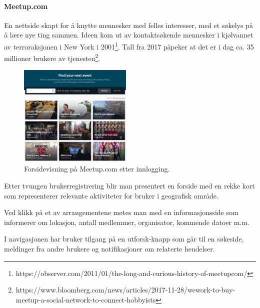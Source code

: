 \vspace{5mm} %

\paragraph{Meetup.com} En nettside skapt for å knytte mennesker med felles interesser, med et søkelys på å lære nye ting sammen. Ideen kom ut av kontaktsøkende mennesker i kjølvannet av terroraksjonen i New York i 2001\footnote{https://observer.com/2011/01/the-long-and-curious-history-of-meetupcom/}. Tall fra 2017 påpeker at det er i dag ca. 35 millioner brukere av tjenesten\footnote{https://www.bloomberg.com/news/articles/2017-11-28/wework-to-buy-meetup-a-social-network-to-connect-hobbyists}.
\begin{figure}
  \begin{center}
    \includegraphics[width=0.48\textwidth]{Illustrasjoner/andre_platformer/meetup_forside.png}
  \end{center}
  \caption{Forsidevisning på Meetup.com etter innlogging.}
\end{figure}

Etter tvungen brukerregistrering blir man presentert en forside med en rekke kort som representerer relevante aktiviteter for bruker i geografisk område. 

\vspace{5mm} %

Ved klikk på et av arrangementene møtes man med en informasjonsside som informerer om lokasjon, antall medlemmer, organisator, kommende datoer m.m.

\vspace{5mm} %

I navigasjonen har bruker tilgang på en utforsk-knapp som går til en søkeside, meldinger fra andre brukere og notifikasjoner om relaterte hendelser.

